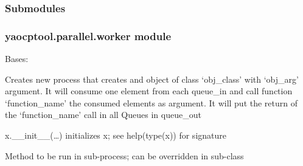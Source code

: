 \documentclass[letterpaper,10pt,english]{sphinxmanual}
\begin{document}
\subsubsection{Submodules}
\label{\detokenize{yaocptool.parallel:submodules}}

\subsubsection{yaocptool.parallel.worker module}
\label{\detokenize{yaocptool.parallel:module-yaocptool.parallel.worker}}\label{\detokenize{yaocptool.parallel:yaocptool-parallel-worker-module}}

\begin{fulllineitems}
\label{\detokenize{yaocptool.parallel:yaocptool.parallel.worker.Worker}}
Bases: 

Creates new process that creates and object of class ‘obj\_class’ with ‘obj\_arg’ argument.
It will consume one element from each queue\_in and call function ‘function\_name’ the consumed elements as argument.
It will put the return of the ‘function\_name’ call in all Queues in queue\_out

\begin{fulllineitems}
\label{\detokenize{yaocptool.parallel:yaocptool.parallel.worker.Worker.__init__}}
x.\_\_init\_\_(…) initializes x; see help(type(x)) for signature

\end{fulllineitems}


\begin{fulllineitems}
\label{\detokenize{yaocptool.parallel:yaocptool.parallel.worker.Worker.run}}
Method to be run in sub-process; can be overridden in sub-class

\end{fulllineitems}


\end{fulllineitems}
\end{document}
